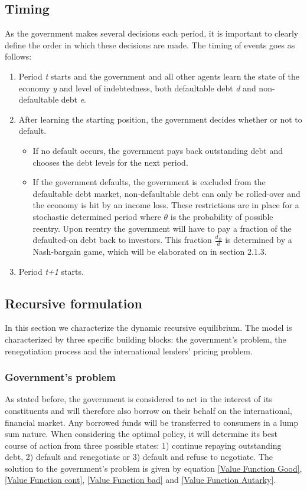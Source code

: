 \subsection{Timing}
As the government makes several decisions each period, it is important to clearly define the order in which these decisions are made. The timing of events goes as follows:
\begin{enumerate}
    \item Period \textit{t} starts and the government and all other agents learn the state of the economy \textit{y} and level of indebtedness, both defaultable debt \textit{d} and non-defaultable debt \textit{e}.
    \item After learning the starting position, the government decides whether or not to default.
    \begin{itemize}
        \item If no default occurs, the government pays back outstanding debt and chooses the debt levels for the next period.
        \item If the government defaults, the government is excluded from the defaultable debt market, non-defaultable debt can only be rolled-over and the economy is hit by an income loss. These restrictions are in place for a stochastic determined period where $\theta$ is the probability of possible reentry. Upon reentry the government will have to pay a fraction of the defaulted-on debt back to investors. This fraction $\frac{d_B}{d}$ is determined by a Nash-bargain game, which will be elaborated on in section 2.1.3.
    \end{itemize}
    \item Period \textit{t+1} starts.
\end{enumerate}
\subsection{Recursive formulation}
In this section we characterize the dynamic recursive equilibrium. The model is characterized by three specific building blocks: the government's problem, the renegotiation process and the international lenders' pricing problem.\\ 

\subsubsection{Government's problem}
As stated before, the government is considered to act in the interest of its constituents and will therefore also borrow on their behalf on the international, financial market. Any borrowed funds will be transferred to consumers in a lump sum nature. When considering the optimal policy, it will determine its best course of action from three possible states: 1) continue repaying outstanding debt, 2) default and renegotiate or 3) default and refuse to negotiate. The solution to the government's problem is given by equation \eqref{Value Function Good}, \eqref{Value Function cont}, \eqref{Value Function bad} and \eqref{Value Function Autarky}.\\

